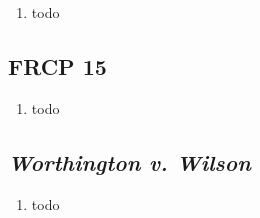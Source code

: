 \begin{enumerate}
    \item todo
\end{enumerate}

\subsection{FRCP 15}

\begin{enumerate}
    \item todo
\end{enumerate}

\subsection{\emph{Worthington v. Wilson}}

\begin{enumerate}
    \item todo
\end{enumerate}
